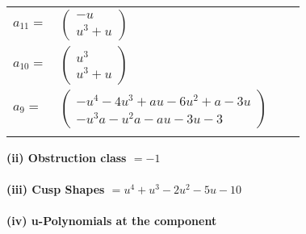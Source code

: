 \documentclass[1p]{elsarticle_modified}
\theoremstyle{definition}
\begin{document}
\begin{tabular}{m{7pt} m{180pt} m{7pt} m{180pt} }
\flushright $a_{11}=$&$\begin{pmatrix}- u\\u^3+u\end{pmatrix}$ \\
\flushright $a_{10}=$&$\begin{pmatrix}u^3\\u^3+u\end{pmatrix}$ \\
\flushright $a_{9}=$&$\begin{pmatrix}- u^4-4 u^3+a u-6 u^2+a-3 u\\- u^3 a- u^2 a- a u-3 u-3\end{pmatrix}$\\&\end{tabular}
\flushleft \textbf{(ii) Obstruction class $= -1$}\\~\\
\flushleft \textbf{(iii) Cusp Shapes $= u^4+u^3-2 u^2-5 u-10$}\\~\\
\newpage\renewcommand{\arraystretch}{1}
\flushleft \textbf{(iv) u-Polynomials at the component}\newline \\
\end{document}
